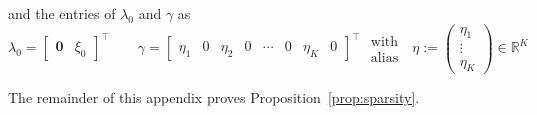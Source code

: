 \documentclass[a4paper,12pt]{article}
\theoremstyle{definition}
\begin{document}
and the entries of $\lambda_0$ and $\gamma$ as 
$$\lambda_0 = \begin{bmatrix}
    \mathbf{0} & \xi_0
\end{bmatrix}^\top \qquad \gamma = \begin{bmatrix}
    \eta_1 & 0 & \eta_2 & 0 & \cdots & 0 & \eta_K & 0
\end{bmatrix}^\top \begin{array}{c}\text{ with }\\\text{ alias }\end{array} \; \eta := \begin{pmatrix}\eta_1 \\ \vdots \\ \eta_K\end{pmatrix} \in \mathbb{R}^K$$

The remainder of this appendix proves Proposition~\ref{prop:sparsity}.
\end{document}
